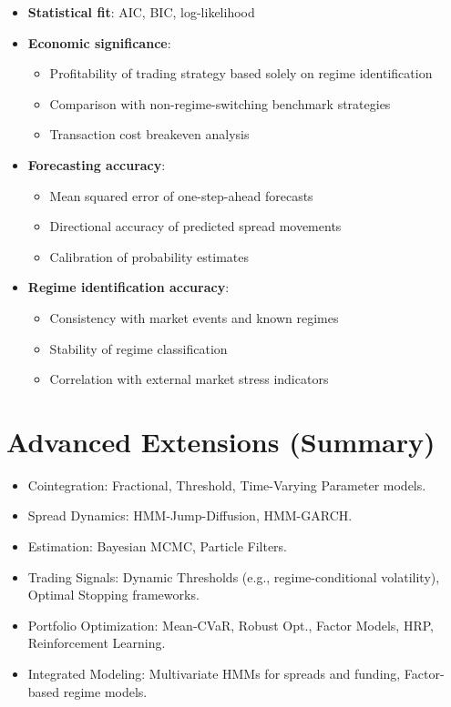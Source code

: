 \documentclass{article}
\begin{document}
\begin{itemize}
    \item \textbf{Statistical fit}: AIC, BIC, log-likelihood
    
    \item \textbf{Economic significance}: 
        \begin{itemize}
            \item Profitability of trading strategy based solely on regime identification
            \item Comparison with non-regime-switching benchmark strategies
            \item Transaction cost breakeven analysis
        \end{itemize}
    
    \item \textbf{Forecasting accuracy}:
        \begin{itemize}
            \item Mean squared error of one-step-ahead forecasts
            \item Directional accuracy of predicted spread movements
            \item Calibration of probability estimates
        \end{itemize}
    
    \item \textbf{Regime identification accuracy}:
        \begin{itemize}
            \item Consistency with market events and known regimes
            \item Stability of regime classification
            \item Correlation with external market stress indicators
        \end{itemize}
\end{itemize}

\section{Advanced Extensions (Summary)}

\begin{itemize}
    \item Cointegration: Fractional, Threshold, Time-Varying Parameter models.
    \item Spread Dynamics: HMM-Jump-Diffusion, HMM-GARCH.
    \item Estimation: Bayesian MCMC, Particle Filters.
    \item Trading Signals: Dynamic Thresholds (e.g., regime-conditional volatility), Optimal Stopping frameworks.
    \item Portfolio Optimization: Mean-CVaR, Robust Opt., Factor Models, HRP, Reinforcement Learning.
    \item Integrated Modeling: Multivariate HMMs for spreads and funding, Factor-based regime models.
\end{itemize}
\end{document}
